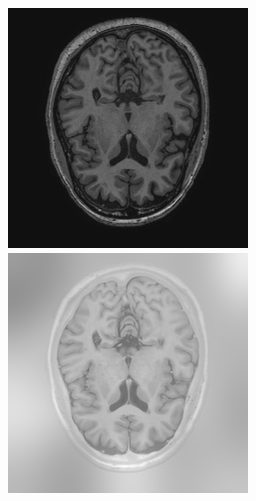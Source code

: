 \documentclass[varwidth=true, border=10pt, convert={size=640x}]{standalone}
\begin{document}
\begin{figure}
 \centering
 \begin{minipage}{.32\textwidth}
 \includegraphics[width=.99\linewidth]{./images/t1.png}
 \end{minipage}
  \begin{minipage}{.32\textwidth}
 \includegraphics[width=.99\linewidth]{./images/t1-ir.png}

\end{minipage}
\end{figure}
\end{document}
